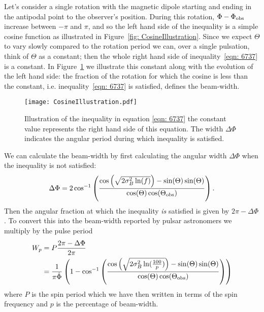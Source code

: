\documentclass[../full_thesis/full_thesis.tex]{subfiles}
\begin{document}
Let's consider a single rotation with the magnetic dipole starting and ending in
the antipodal point to the observer's position. During this rotation, $\Phi -
\Phi_{\mathrm{obs}}$ increase between $-\pi$ and $\pi$, and so the left hand side of the
inequality is a simple cosine function as illustrated in Figure~\ref{fig:
CosineIllustration}.  Since we expect $\Theta$ to vary slowly compared to the
rotation period we can, over a single pulsation, think of $\Theta$ as a
constant; then the whole right hand side of inequality~\eqref{eqn: 6737} is a
constant. In Figure~\ref{fig: CosineIllustration} we illustrate this constant
along with the evolution of the left hand side: the fraction of the rotation
for which the cosine is less than the constant, i.e. inequality~\eqref{eqn: 6737}
is satisfied, defines the beam-width.
\begin{figure}[ht]
\centering
\texttt{[image: CosineIllustration.pdf]}
\caption{Illustration of the inequality in equation \eqref{eqn: 6737} the constant
         value represents the right hand side of this equation. The
         width $\Delta\Phi$ indicates the angular period during which inequality
         is satisfied.}
\label{fig: CosineIllustration}
\end{figure}

We can calculate the beam-width by first calculating the angular width $\Delta\Phi$
when the inequality is not satisfied:
\begin{equation}
    \Delta\Phi = 2\cos^{-1}\left(
                \frac{\cos\left(\sqrt{2\sigma_{B}^{2} \ln(f)}\right) - \sin(\Theta)\sin(\Theta)}
                          {\cos(\Theta)\cos(\Theta_{\mathrm{obs}})}
                      \right).
\end{equation}
Then the angular fraction at which the inequality \emph{is} satisfied is given by
$2\pi - \Delta\Phi$. To convert this into the beam-width reported by pulsar
astronomers we multiply by the pulse period
\begin{align}
    W_{p} & = P \frac{2\pi - \Delta\Phi}{2\pi}\\
          & = \frac{1}{\pi \dot{\Phi}}\left(1 -
               \cos^{-1}\left(
                   \frac{\cos\left(\sqrt{2\sigma_{B}^{2} \ln(\frac{100}{p})}\right) - \sin(\Theta)\sin(\Theta)}
                          {\cos(\Theta)\cos(\Theta_{\mathrm{obs}})}
                      \right)
                  \right)
\label{eqn: Wp}
\end{align}
where $P$ is the spin period which we have then written in terms of the spin
frequency and $p$ is the percentage of beam-width.
\end{document}
